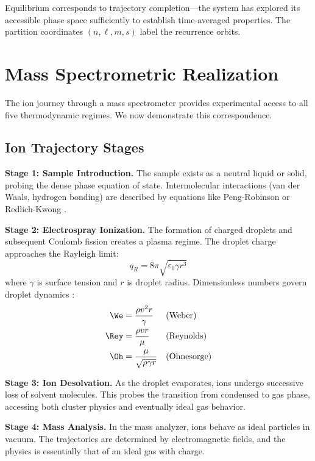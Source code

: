 Equilibrium corresponds to trajectory completion---the system has explored its accessible phase space sufficiently to establish time-averaged properties. The partition coordinates $(n, \ell, m, s)$ label the recurrence orbits.

\section{Mass Spectrometric Realization}
\label{sec:ms}

The ion journey through a mass spectrometer \cite{gross2017mass, fenn1989electrospray} provides experimental access to all five thermodynamic regimes. We now demonstrate this correspondence.

\subsection{Ion Trajectory Stages}

\textbf{Stage 1: Sample Introduction.} The sample exists as a neutral liquid or solid, probing the dense phase equation of state. Intermolecular interactions (van der Waals, hydrogen bonding) are described by equations like Peng-Robinson \cite{peng1976new} or Redlich-Kwong \cite{redlich1949algebraic}.

\textbf{Stage 2: Electrospray Ionization.} The formation of charged droplets and subsequent Coulomb fission \cite{dole1968molecular, iribarne1976evaporation, kebarle2009electrospray} creates a plasma regime. The droplet charge approaches the Rayleigh limit:
\begin{equation}
q_R = 8\pi\sqrt{\varepsilon_0 \gamma r^3}
\end{equation}
where $\gamma$ is surface tension and $r$ is droplet radius. Dimensionless numbers govern droplet dynamics \cite{white2011fluid, ohnesorge1936formation, clift1978bubbles}:
\begin{align}
\We &= \frac{\rho v^2 r}{\gamma} & &\text{(Weber)} \\
\Rey &= \frac{\rho v r}{\mu} & &\text{(Reynolds)} \\
\Oh &= \frac{\mu}{\sqrt{\rho \gamma r}} & &\text{(Ohnesorge)}
\end{align}

\textbf{Stage 3: Ion Desolvation.} As the droplet evaporates, ions undergo successive loss of solvent molecules. This probes the transition from condensed to gas phase, accessing both cluster physics and eventually ideal gas behavior.

\textbf{Stage 4: Mass Analysis.} In the mass analyzer, ions behave as ideal particles in vacuum. The trajectories are determined by electromagnetic fields, and the physics is essentially that of an ideal gas with charge.

